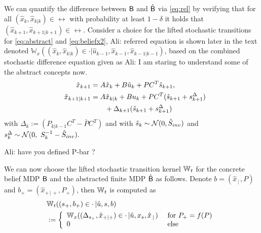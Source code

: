 \documentclass{ifacconf}
\renewcommand{\axx}[1]{{\color{orange} Ali: #1}}
\begin{document}
We can quantify the difference between $\mathsf{B}$ and $\hat{\mathsf{B}}$ via \eqref{eq:rel} by verifying that for all  $(\hat x_k,\hat x_{k|k})\in \rel$ with probability at least $1-\delta$ it holds that $(\hat x_{k+1},\hat x_{k+1|k+1})\in \rel$. 
Consider a choice for the lifted stochastic  transitions  for \eqref{eq:abstract} and \eqref{eq:beliefx2}, \axx{referred equation is shown later in the text} denoted 
	$ \mathbb W_{x}((\hat x_k, \hat x_{k|k})\in \cdot| \hat u_{k-1}, \hat x_{k-1}, \hat x_{k-1|k-1})$, based on the combined stochastic difference equation given as
\axx{I am staring to understand some of the abstract concepts now.}
\begin{align*}
		&&\hat x_{k+1} &=A\hat x_{k} +B\hat u_{k} + \bar P  C^T  \hat{s}_{k+1},\\%
	&&\hat x_{k+1|k+1}&=A\hat x_{k|k}+Bu_{k}+  \bar P   C^T(  \hat{s}_{k+1}+s^\Delta_{k+1})\notag\\&&&\qquad+\Delta_{k+1}( \hat{s}_{k+1}+ s^\Delta_{k+1})%
\end{align*}
 with $\Delta_k:=(P_{k|k-1}C^T-  \bar P   C^T)$ and with $ \hat{s}_k\sim \mathcal{N} (0,\hat{S}_{inv})$ and $ s^\Delta_k\sim  \mathcal{N} (0,\  S_k^{-1}-\hat{S}_{inv}). $

\axx{have you defined P-bar ?}

We can now choose the lifted stochastic transition kernel 	$\mathbb{W}_{t}$ for the concrete belief MDP $\mathsf{B}$ and the abstracted finite MDP $\hat{\mathsf{B}}$ as follows.
Denote $b=(\hat x_{\,|\,}, P)$ and $b_+=(\hat x_{+\,|\,+}, P_+)$, then 	$\mathbb{W}_{t}$ is computed as 
 \begin{align*}
 &	\mathbb{W}_{t}((s_+,b_+)\in \cdot\,| \hat u, s ,b)\\&:= \left\{\begin{array}{ll} \mathbb W_{x}((\Delta_{s_+}, \hat x_{+|+})\in \cdot\,|  \hat u,x_s , \hat x_{\,|\,}) &\text{ for }  P_+=f(P)\\
 	0 & \text{ else } \end{array}\right.
 \end{align*}
\end{document}
